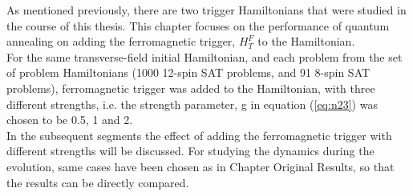 \documentclass[../main.tex]{subfiles}
\begin{document}
As mentioned previously, there are two trigger Hamiltonians that were studied in the course of this thesis. This chapter focuses on the performance of quantum annealing on adding the ferromagnetic trigger, $H_T^F$ to the Hamiltonian. \\
For the same transverse-field initial Hamiltonian, and each problem from the set of problem Hamiltonians (1000 12-spin SAT problems, and 91 8-spin SAT problems), ferromagnetic trigger was added to the Hamiltonian, with three different strengths, i.e. the strength parameter, g in equation (\ref{eq:n23}) was chosen to be 0.5, 1 and 2.\\
In the subsequent segments the effect of adding the ferromagnetic trigger with different strengths will be discussed. For studying the dynamics during the evolution, same cases have been chosen as in Chapter Original Results, so that the results can be directly compared. 
\end{document}
